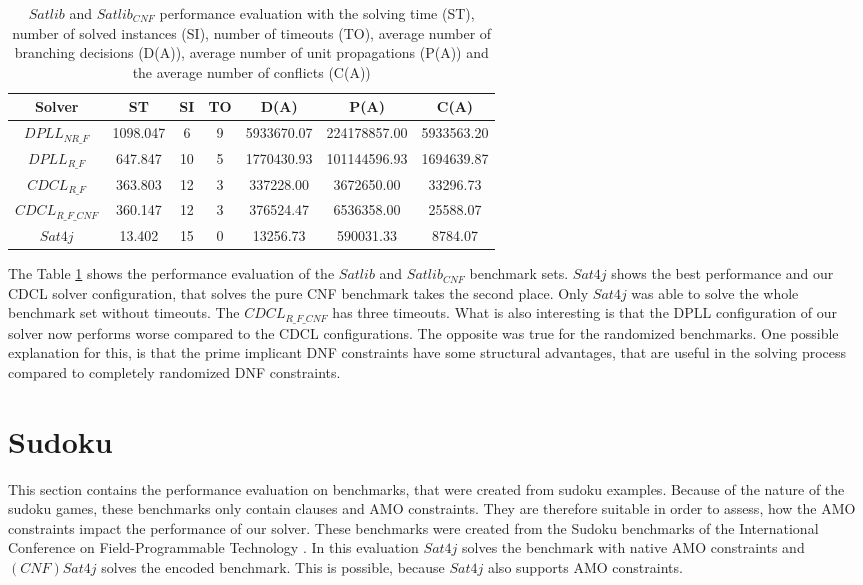 \begin{table}[htb]
\centering
\caption[$Satlib$ and $Satlib_{CNF}$ performance evaluation]{$Satlib$ and $Satlib_{CNF}$ performance evaluation with the solving time (ST), number of solved instances (SI), number of timeouts (TO), average number of branching decisions (D(A)), average number of unit propagations (P(A)) and the average number of conflicts (C(A))}
\label{tab:satlibSat}
\begin{tabular}{|c|c|c|c|c|c|c|}
\hline
Solver & ST & SI & TO & D(A) & P(A) & C(A)\\ 
\hline
$DPLL_{NR\_F}$ & 1098.047 & 6 & 9 & 5933670.07 & 224178857.00 & 5933563.20 \\ 
\hline
$DPLL_{R\_F}$ & 647.847 & 10 & 5 & 1770430.93 & 101144596.93 & 1694639.87 \\ 
\hline
$CDCL_{R\_F}$ & 363.803 & 12 & 3 & 337228.00 & 3672650.00 & 33296.73 \\ 
\hline
$CDCL_{R\_F\_CNF}$ & 360.147 & 12 & 3 & 376524.47 & 6536358.00 & 25588.07 \\ 
\hline
$Sat4j$ & 13.402 & 15 & 0 & 13256.73 & 590031.33 & 8784.07 \\ 
\hline
\end{tabular}
\end{table}

The Table \ref{tab:satlibSat} shows the performance evaluation of the $Satlib$ and $Satlib_{CNF}$ benchmark sets. $Sat4j$ shows the best performance and our CDCL solver configuration, that solves the pure CNF benchmark takes the second place. Only $Sat4j$ was able to solve the whole benchmark set without timeouts. The $CDCL_{R\_F\_CNF}$ has three timeouts. What is also interesting is that the DPLL configuration of our solver now performs worse compared to the CDCL configurations. The opposite was true for the randomized benchmarks. One possible explanation for this, is that the prime implicant DNF constraints have some structural advantages, that are useful in the solving process compared to completely randomized DNF constraints.

\section{Sudoku}

This section contains the performance evaluation on benchmarks, that were created from sudoku examples. Because of the nature of the sudoku games, these benchmarks only contain clauses and AMO constraints. They are therefore suitable in order to assess, how the AMO constraints impact the performance of our solver. These benchmarks were created from the Sudoku benchmarks of the International Conference on Field-Programmable Technology \cite{noauthor_international_nodate}. In this evaluation $Sat4j$ solves the benchmark with native AMO constraints and $(CNF)Sat4j$ solves the encoded benchmark. This is possible, because $Sat4j$ also supports AMO constraints.

